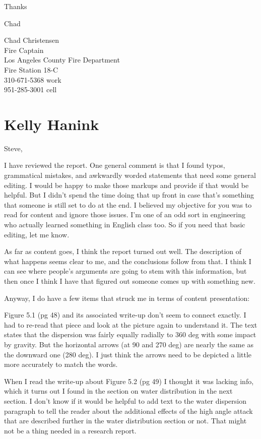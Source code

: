 \documentclass[12pt,oneside]{book}
\begin{document}
\begin{appendix}
Thanks
 
Chad
 
Chad Christensen \\
Fire Captain \\
Los Angeles County Fire Department \\
Fire Station 18-C \\
310-671-5368 work \\
951-285-3001 cell \\

\section{Kelly Hanink}

Steve,
 
I have reviewed the report.  One general comment is that I found typos, grammatical mistakes, and awkwardly worded statements that need some general editing.  I would be happy to make those markups and provide if that would be helpful.  But I didn't spend the time doing that up front in case that's something that someone is still set to do at the end.  I believed my objective for you was to read for content and ignore those issues.  I'm one of an odd sort in engineering who actually learned something in English class too. So if you need that basic editing, let me know.
 
As far as content goes, I think the report turned out well.  The description of what happens seems clear to me, and the conclusions follow from that.  I think I can see where people's arguments are going to stem with this information, but then once I think I have that figured out someone comes up with something new.  
 
Anyway, I do have a few items that struck me in terms of content presentation:
 
Figure 5.1 (pg 48) and its associated write-up don't seem to connect exactly.  I had to re-read that piece and look at the picture again to understand it.  The text states that the dispersion was fairly equally radially to 360 deg with some impact by gravity.  But the horizontal arrows (at 90 and 270 deg) are nearly the same as the downward one (280 deg).  I just think the arrows need to be depicted a little more accurately to match the words.
 
When I read the write-up about Figure 5.2 (pg 49) I thought it was lacking info, which it turns out I found in the section on water distribution in the next section.  I don't know if it would be helpful to add text to the water dispersion paragraph to tell the reader about the additional effects of the high angle attack that are described further in the water distribution section or not.  That might not be a thing needed in a research report.
 

\end{appendix}
\end{document}
